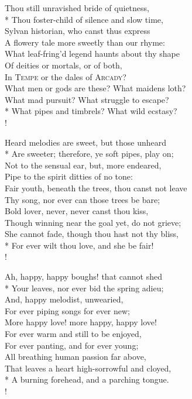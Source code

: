 Thou still unravished bride of quietness,\\*
\vin Thou foster-child of silence and slow time,\\
Sylvan historian, who canst thus express\\
\vin A flowery tale more sweetly than our rhyme:\\
What leaf-fring'd legend haunts about thy shape\\
\vin Of deities or mortals, or of both,\\
\vin \vin In \textsc{Tempe} or the dales of \textsc{Arcady}?\\
\vin What men or gods are these? What maidens loth?\\
What mad pursuit? What struggle to escape?\\*
\vin \vin What pipes and timbrels? What wild ecstasy?\\!

Heard melodies are sweet, but those unheard\\*
\vin Are sweeter; therefore, ye soft pipes, play on;\\
Not to the sensual ear, but, more endeared,\\
\vin Pipe to the spirit ditties of no tone:\\
Fair youth, beneath the trees, thou canst not leave\\
\vin Thy song, nor ever can those trees be bare;\\
\vin \vin Bold lover, never, never canst thou kiss,\\
Though winning near the goal yet, do not grieve;\\
\vin She cannot fade, though thou hast not thy bliss,\\*
\vin \vin For ever wilt thou love, and she be fair!\\!

Ah, happy, happy boughs! that cannot shed\\*
\vin Your leaves, nor ever bid the spring adieu;\\
And, happy melodist, unwearied,\\
\vin For ever piping songs for ever new;\\
More happy love! more happy, happy love!\\
\vin For ever warm and still to be enjoyed,\\
\vin \vin For ever panting, and for ever young;\\
All breathing human passion far above,\\
\vin That leaves a heart high-sorrowful and cloyed,\\*
\vin \vin A burning forehead, and a parching tongue.\\!

